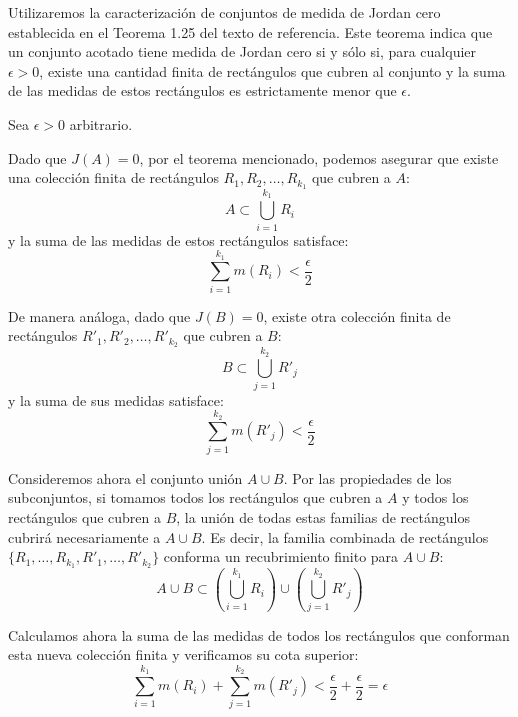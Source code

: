 \documentclass[11pt,letterpaper]{article}
\begin{document}
Utilizaremos la caracterización de conjuntos de medida de Jordan cero establecida en el Teorema 1.25 del texto de referencia. Este teorema indica que un conjunto acotado tiene medida de Jordan cero si y sólo si, para cualquier $\epsilon > 0$, existe una cantidad finita de rectángulos que cubren al conjunto y la suma de las medidas de estos rectángulos es estrictamente menor que $\epsilon$.

Sea $\epsilon > 0$ arbitrario. 

Dado que $J(A) = 0$, por el teorema mencionado, podemos asegurar que existe una colección finita de rectángulos $R_1, R_2, \dots, R_{k_1}$ que cubren a $A$:
\begin{equation*}
A \subset \bigcup_{i=1}^{k_1} R_i
\end{equation*}
y la suma de las medidas de estos rectángulos satisface:
\begin{equation*}
\sum_{i=1}^{k_1} m(R_i) < \frac{\epsilon}{2}
\end{equation*}

De manera análoga, dado que $J(B) = 0$, existe otra colección finita de rectángulos $R'_1, R'_2, \dots, R'_{k_2}$ que cubren a $B$:
\begin{equation*}
B \subset \bigcup_{j=1}^{k_2} R'_j
\end{equation*}
y la suma de sus medidas satisface:
\begin{equation*}
\sum_{j=1}^{k_2} m(R'_j) < \frac{\epsilon}{2}
\end{equation*}

Consideremos ahora el conjunto unión $A \cup B$. Por las propiedades de los subconjuntos, si tomamos todos los rectángulos que cubren a $A$ y todos los rectángulos que cubren a $B$, la unión de todas estas familias de rectángulos cubrirá necesariamente a $A \cup B$. Es decir, la familia combinada de rectángulos $\{R_1, \dots, R_{k_1}, R'_1, \dots, R'_{k_2}\}$ conforma un recubrimiento finito para $A \cup B$:
\begin{equation*}
A \cup B \subset \left( \bigcup_{i=1}^{k_1} R_i \right) \cup \left( \bigcup_{j=1}^{k_2} R'_j \right)
\end{equation*}

Calculamos ahora la suma de las medidas de todos los rectángulos que conforman esta nueva colección finita y verificamos su cota superior:
\begin{equation*}
\sum_{i=1}^{k_1} m(R_i) + \sum_{j=1}^{k_2} m(R'_j) < \frac{\epsilon}{2} + \frac{\epsilon}{2} = \epsilon
\end{equation*}
\end{document}
